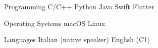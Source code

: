 

\begin{cvskills}

  \cvskill
    {Programming} %
    {C/C++ {\enskip\cdotp\enskip} Python {\enskip\cdotp\enskip} Java {\enskip\cdotp\enskip} Swift {\enskip\cdotp\enskip} Flutter} %
    
  \cvskill
    {Operating Systems} %
    {macOS {\enskip\cdotp\enskip} Linux} %

  \cvskill
    {Languages} %
    {Italian (native speaker) {\enskip\cdotp\enskip} English (C1)} %

\end{cvskills}
